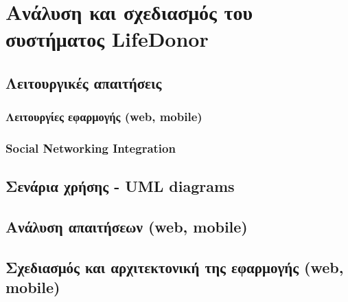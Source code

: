 \chapter{Ανάλυση και σχεδιασμός του συστήματος LifeDonor}\label{ch:Analysis of LifeDonor}
\section{Λειτουργικές απαιτήσεις}
	\subsection{Λειτουργίες εφαρμογής (web, mobile)}
	\subsection{Social Networking Integration}

\section{Σενάρια χρήσης - UML diagrams}
\section{Ανάλυση απαιτήσεων (web, mobile)}
\section{Σχεδιασμός και αρχιτεκτονική της εφαρμογής (web, mobile)}
